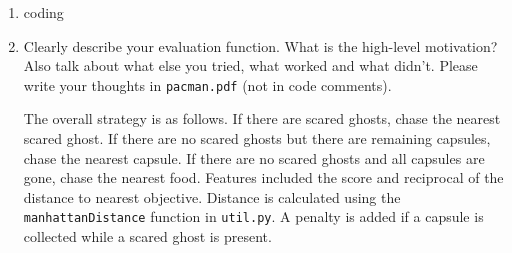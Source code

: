 \documentclass[10pt]{article}
\begin{document}
\begin{enumerate}[label=(\alph*)]

  \item coding
  
  \item Clearly describe your evaluation function. What is the high-level motivation? Also talk about what else you tried, what worked and what didn't. Please write your thoughts in \texttt{pacman.pdf} (not in code comments).
  
  The overall strategy is as follows. If there are scared ghosts, chase the nearest scared ghost. If there are no scared ghosts but there are remaining capsules, chase the nearest capsule. If there are no scared ghosts and all capsules are gone, chase the nearest food. Features included the score and reciprocal of the distance to nearest objective. Distance is calculated using the \texttt{manhattanDistance} function in \texttt{util.py}. A penalty is added if a capsule is collected while a scared ghost is present.
		
\end{enumerate}
\fi
\end{document}
